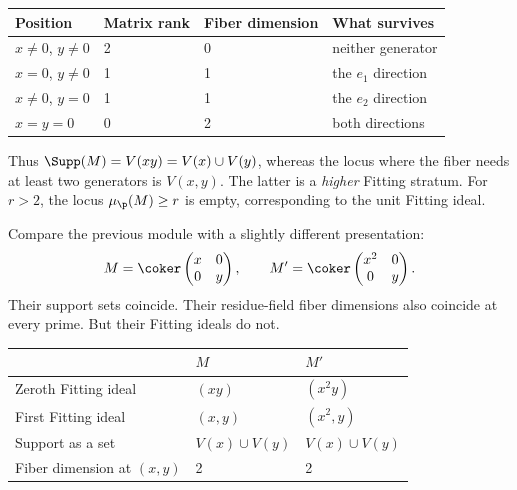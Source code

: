\begin{center}\small
\begin{tabular}{@{}llll@{}}\toprule
Position & Matrix rank & Fiber dimension & What survives\\\midrule
$x\ne0$, $y\ne0$ & 2 & 0 & neither generator\\
$x=0$, $y\ne0$ & 1 & 1 & the $e_1$ direction\\
$x\ne0$, $y=0$ & 1 & 1 & the $e_2$ direction\\
$x=y=0$ & 0 & 2 & both directions\\\bottomrule
\end{tabular}
\end{center}
Thus $\Supp(M)=V(xy)=V(x)\cup V(y)$, whereas the locus where the fiber needs at least two generators is $V(x,y)$. The latter is a \emph{higher} Fitting stratum. For $r>2$, the locus $\mu_{\p}(M)\ge r$ is empty, corresponding to the unit Fitting ideal.


Compare the previous module with a slightly different presentation:
\[
M=\coker\begin{pmatrix}x&0\\0&y\end{pmatrix},
\qquad
M'=\coker\begin{pmatrix}x^2&0\\0&y\end{pmatrix}.
\]
Their support sets coincide. Their residue-field fiber dimensions also coincide at every prime. But their Fitting ideals do not.

\begin{center}
\begin{tabular}{@{}lll@{}}\toprule
 & $M$ & $M'$\\\midrule
Zeroth Fitting ideal & $(xy)$ & $(x^2y)$\\
First Fitting ideal & $(x,y)$ & $(x^2,y)$\\
Support as a set & $V(x)\cup V(y)$ & $V(x)\cup V(y)$\\
Fiber dimension at $(x,y)$ & 2 & 2\\\bottomrule
\end{tabular}
\end{center}

